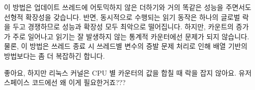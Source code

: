 이 방법은 업데이트 쓰레드에 어토믹하지 않은 더하기와 거의 똑같은 성능을
주면서도 선형적 확장성을 갖습니다.
반면, 동시적으로 수행되는 읽기 동작은 하나의 글로벌 락을 두고 경쟁하므로 성능과
확장성 모두 최악으로 떨어집니다.
하지만, 카운트의 증가가 주로 일어나고 읽기는 잘 발생하지 않는 통계적 카운터에선
문제가 되지 않습니다.
물론, 이 방법은 쓰레드 종료 시 쓰레드별 변수의 증발 문제 처리로 인해 배열
기반의 방법보다는 좀 더 복잡하긴 합니다.

\QuickQuiz{}
	좋아요, 하지만 리눅스 커널은 CPU 별 카운터의 값을 합칠 때 락을 잡지
	않아요.
	유저 스페이스 코드에선 왜 이게 필요한거죠???
	\iffalse

